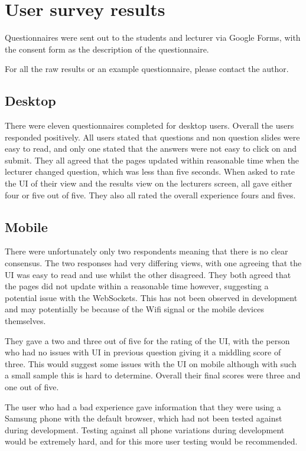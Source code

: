 \chapter{User survey results}
\label{appendix:user-results}
Questionnaires were sent out to the students and lecturer via Google Forms, with the consent form as the description of the questionnaire.

For all the raw results or an example questionnaire, please contact the author.

\section{Desktop}
There were eleven questionnaires completed for desktop users. Overall the users responded positively. All users stated that questions and non question slides were easy to read, and only one stated that the answers were not easy to click on and submit. They all agreed that the pages updated within reasonable time when the lecturer changed question, which was less than five seconds. When asked to rate the UI of their view and the results view on the lecturers screen, all gave either four or five out of five. They also all rated the overall experience fours and fives.
\section{Mobile}
There were unfortunately only two respondents meaning that there is no clear consensus. The two responses had very differing views, with one agreeing that the UI was easy to read and use whilst the other disagreed. They both agreed that the pages did not update within a reasonable time however, suggesting a potential issue with the WebSockets. This has not been observed in development and may potentially be because of the Wifi signal or the mobile devices themselves.

They gave a two and three out of five for the rating of the UI, with the person who had no issues with UI in previous question giving it a middling score of three. This would suggest some issues with the UI on mobile although with such a small sample this is hard to determine. Overall their final scores were three and one out of five. 

The user who had a bad experience gave information that they were using a Samsung phone with the default browser, which had not been tested against during development. Testing against all phone variations during development would be extremely hard, and for this more user testing would be recommended.
